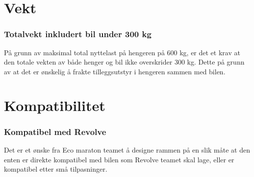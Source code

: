\section{Vekt}
\subsubsection{Totalvekt inkludert bil under 300 kg}
På grunn av maksimal total nyttelast på hengeren på 600 kg, er det et krav at den totale vekten av både henger og bil ikke overskrider 300 kg. Dette på grunn av at det er ønskelig å frakte tilleggsutstyr i hengeren sammen med bilen.  
\section{Kompatibilitet}
\subsubsection{Kompatibel med Revolve}
Det er et ønske fra Eco maraton teamet å designe rammen på en slik måte at den enten er direkte kompatibel med bilen som Revolve teamet skal lage, eller er kompatibel etter små tilpasninger. 
